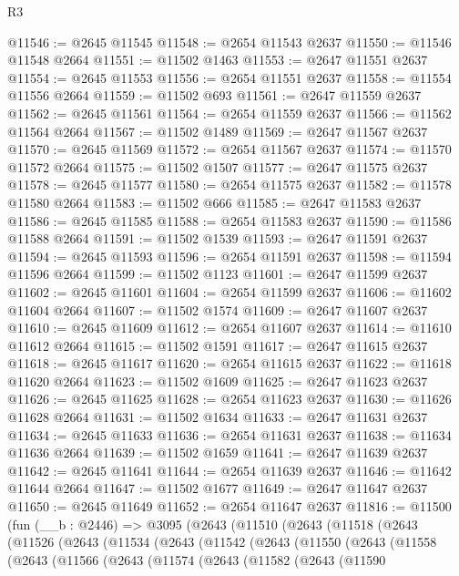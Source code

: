 \begin{lexlean}{R3}
\begin{coremodule}
@11546 := @2645 @11545
@11548 := @2654 @11543 @2637
@11550 := @11546 @11548 @2664
@11551 := @11502 @1463
@11553 := @2647 @11551 @2637
@11554 := @2645 @11553
@11556 := @2654 @11551 @2637
@11558 := @11554 @11556 @2664
@11559 := @11502 @693
@11561 := @2647 @11559 @2637
@11562 := @2645 @11561
@11564 := @2654 @11559 @2637
@11566 := @11562 @11564 @2664
@11567 := @11502 @1489
@11569 := @2647 @11567 @2637
@11570 := @2645 @11569
@11572 := @2654 @11567 @2637
@11574 := @11570 @11572 @2664
@11575 := @11502 @1507
@11577 := @2647 @11575 @2637
@11578 := @2645 @11577
@11580 := @2654 @11575 @2637
@11582 := @11578 @11580 @2664
@11583 := @11502 @666
@11585 := @2647 @11583 @2637
@11586 := @2645 @11585
@11588 := @2654 @11583 @2637
@11590 := @11586 @11588 @2664
@11591 := @11502 @1539
@11593 := @2647 @11591 @2637
@11594 := @2645 @11593
@11596 := @2654 @11591 @2637
@11598 := @11594 @11596 @2664
@11599 := @11502 @1123
@11601 := @2647 @11599 @2637
@11602 := @2645 @11601
@11604 := @2654 @11599 @2637
@11606 := @11602 @11604 @2664
@11607 := @11502 @1574
@11609 := @2647 @11607 @2637
@11610 := @2645 @11609
@11612 := @2654 @11607 @2637
@11614 := @11610 @11612 @2664
@11615 := @11502 @1591
@11617 := @2647 @11615 @2637
@11618 := @2645 @11617
@11620 := @2654 @11615 @2637
@11622 := @11618 @11620 @2664
@11623 := @11502 @1609
@11625 := @2647 @11623 @2637
@11626 := @2645 @11625
@11628 := @2654 @11623 @2637
@11630 := @11626 @11628 @2664
@11631 := @11502 @1634
@11633 := @2647 @11631 @2637
@11634 := @2645 @11633
@11636 := @2654 @11631 @2637
@11638 := @11634 @11636 @2664
@11639 := @11502 @1659
@11641 := @2647 @11639 @2637
@11642 := @2645 @11641
@11644 := @2654 @11639 @2637
@11646 := @11642 @11644 @2664
@11647 := @11502 @1677
@11649 := @2647 @11647 @2637
@11650 := @2645 @11649
@11652 := @2654 @11647 @2637
@11816 := @11500
    (fun (__b : @2446) =>
    @3095
      (@2643
        (@11510
          (@2643
            (@11518
              (@2643
                (@11526
                  (@2643
                    (@11534
                      (@2643
                        (@11542
                          (@2643
                            (@11550
                              (@2643
                                (@11558
                                  (@2643
                                    (@11566
                                      (@2643
                                        (@11574
                                          (@2643
                                            (@11582
                                              (@2643
                                                (@11590

\end{coremodule}
\end{lexlean}
